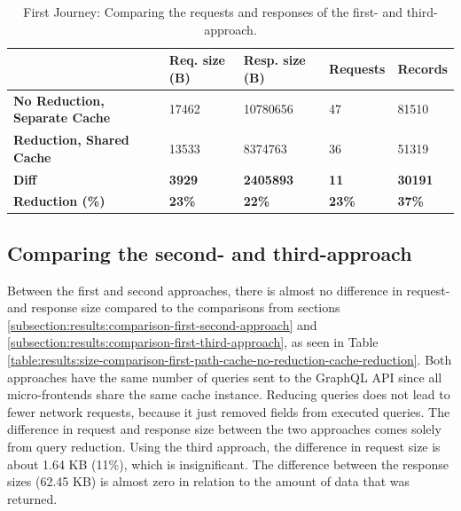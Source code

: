 \ifshowTables
\begin{table}[H]
  \begin{tabular}{|l|l|l|l|l|}
  \hline
  & \textbf{Req. size (B)} & \textbf{Resp. size (B)} & \textbf{Requests} & \textbf{Records}  \\
  \hline
  \textbf{No Reduction, Separate Cache} & 17462 & 10780656 & 47 & 81510 \\
  \hline
  \textbf{Reduction, Shared Cache} & 13533 & 8374763 & 36 & 51319 \\
  \hline
  \hline
  \textbf{Diff} & \textbf{3929} & \textbf{2405893} & \textbf{11} & \textbf{30191} \\
  \hline
  \textbf{Reduction (\%)} & \textbf{23\%} & \textbf{22\%} & \textbf{23\%} & \textbf{37\%} \\
  \hline
  \end{tabular}
  \caption{First Journey: Comparing the requests and responses of the first- and third-approach.}\label{table:results:size-comparison-first-path-no-cache-no-reduction-cache-reduction}
\end{table}
\fi

\subsection{Comparing the second- and third-approach}\label{subsection:results:comparison-second-third-approach}

Between the first and second approaches, there is almost no difference in request- and response size compared to the comparisons from sections \ref{subsection:results:comparison-first-second-approach} and \ref{subsection:results:comparison-first-third-approach}, as seen in Table \ref{table:results:size-comparison-first-path-cache-no-reduction-cache-reduction}. Both approaches have the same number of queries sent to the GraphQL \ac{API} since all micro-frontends share the same cache instance. Reducing queries does not lead to fewer network requests, because it just removed fields from executed queries. The difference in request and response size between the two approaches comes solely from query reduction. Using the third approach, the difference in request size is about 1.64 KB (11\%), which is insignificant. The difference between the response sizes (62.45 KB) is almost zero in relation to the amount of data that was returned.

